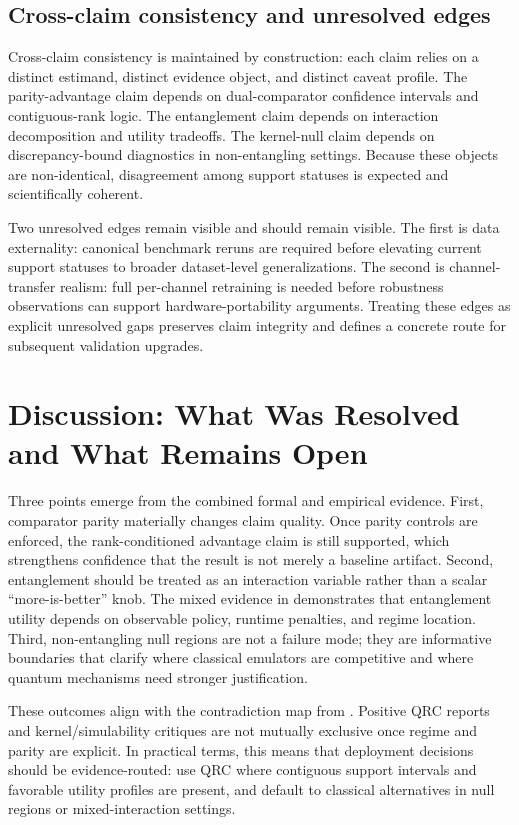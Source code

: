 \documentclass{article} %
\begin{document}
\subsection{Cross-claim consistency and unresolved edges}
Cross-claim consistency is maintained by construction: each claim relies on a distinct estimand, distinct evidence object, and distinct caveat profile. The parity-advantage claim depends on dual-comparator confidence intervals and contiguous-rank logic. The entanglement claim depends on interaction decomposition and utility tradeoffs. The kernel-null claim depends on discrepancy-bound diagnostics in non-entangling settings. Because these objects are non-identical, disagreement among support statuses is expected and scientifically coherent.

Two unresolved edges remain visible and should remain visible. The first is data externality: canonical benchmark reruns are required before elevating current support statuses to broader dataset-level generalizations. The second is channel-transfer realism: full per-channel retraining is needed before robustness observations can support hardware-portability arguments. Treating these edges as explicit unresolved gaps preserves claim integrity and defines a concrete route for subsequent validation upgrades.

\section{Discussion: What Was Resolved and What Remains Open}\label{sec:discussion}
Three points emerge from the combined formal and empirical evidence. First, comparator parity materially changes claim quality. Once parity controls are enforced, the rank-conditioned advantage claim is still supported, which strengthens confidence that the result is not merely a baseline artifact. Second, entanglement should be treated as an interaction variable rather than a scalar ``more-is-better'' knob. The mixed evidence in  demonstrates that entanglement utility depends on observable policy, runtime penalties, and regime location. Third, non-entangling null regions are not a failure mode; they are informative boundaries that clarify where classical emulators are competitive and where quantum mechanisms need stronger justification.

These outcomes align with the contradiction map from . Positive QRC reports and kernel/simulability critiques are not mutually exclusive once regime and parity are explicit. In practical terms, this means that deployment decisions should be evidence-routed: use QRC where contiguous support intervals and favorable utility profiles are present, and default to classical alternatives in null regions or mixed-interaction settings.
\end{document}
